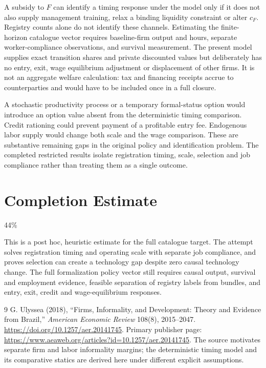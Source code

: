 \documentclass[11pt,a4paper]{article}
\theoremstyle{definition}
\theoremstyle{remark}
\begin{document}
A subsidy to $F$ can identify a timing response under the model only if it does not also supply management training, relax a binding liquidity constraint or alter $c_F$. Registry counts alone do not identify these channels. Estimating the finite-horizon catalogue vector requires baseline-firm output and hours, separate worker-compliance observations, and survival measurement. The present model supplies exact transition shares and private discounted values but deliberately has no entry, exit, wage equilibrium adjustment or displacement of other firms. It is not an aggregate welfare calculation: tax and financing receipts accrue to counterparties and would have to be included once in a full closure.

A stochastic productivity process or a temporary formal-status option would introduce an option value absent from the deterministic timing comparison. Credit rationing could prevent payment of a profitable entry fee. Endogenous labor supply would change both scale and the wage comparison. These are substantive remaining gaps in the original policy and identification problem. The completed restricted results isolate registration timing, scale, selection and job compliance rather than treating them as a single outcome.

\section{Completion Estimate}
44\%

This is a post hoc, heuristic estimate for the full catalogue target.
The attempt solves registration timing and operating scale with separate job compliance, and proves selection can create a technology gap despite zero causal technology change. The full formalization policy vector still requires causal output, survival and employment evidence, feasible separation of registry labels from bundles, and entry, exit, credit and wage-equilibrium responses.

\begin{thebibliography}{9}
 G. Ulyssea (2018), ``Firms, Informality, and Development: Theory and Evidence from Brazil,'' \emph{American Economic Review} 108(8), 2015--2047. \url{https://doi.org/10.1257/aer.20141745}. Primary publisher page: \url{https://www.aeaweb.org/articles?id=10.1257/aer.20141745}. The source motivates separate firm and labor informality margins; the deterministic timing model and its comparative statics are derived here under different explicit assumptions.
\end{thebibliography}
\end{document}
